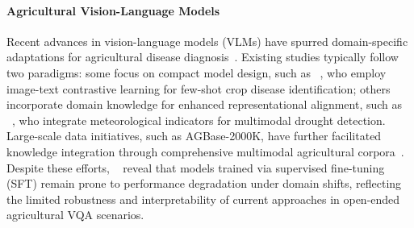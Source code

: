 \documentclass[11pt]{article}
\begin{document}
\paragraph{Agricultural Vision-Language Models}
Recent advances in vision-language models (VLMs) have spurred domain-specific adaptations for agricultural disease diagnosis~\cite{zhou2024few,awais2025agrogpt,arshad2025leveraging}. Existing studies typically follow two paradigms: some focus on compact model design, such as ~\citet{cao2025small}, who employ image-text contrastive learning for few-shot crop disease identification; others incorporate domain knowledge for enhanced representational alignment, such as ~\citet{yao2024multimodal}, who integrate meteorological indicators for multimodal drought detection. Large-scale data initiatives, such as AGBase-2000K, have further facilitated knowledge integration through comprehensive multimodal agricultural corpora~\cite{gauba2025agmmu}. Despite these efforts, ~\citet{liu2024multimodal} reveal that models trained via supervised fine-tuning (SFT) remain prone to performance degradation under domain shifts, reflecting the limited robustness and interpretability of current approaches in open-ended agricultural VQA scenarios.



\end{document}
